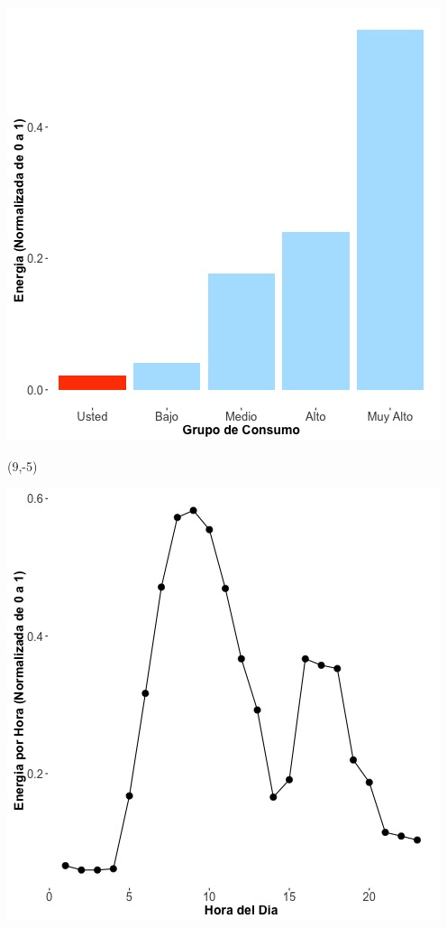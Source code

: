 \documentclass{article}\usepackage[]{graphicx}\usepackage[]{color}
\newenvironment{knitrout}{}{} %
\begin{document}
\begin{knitrout}
\color{fgcolor}
\includegraphics[scale=0.65]{figure/A6_neighbor_plot} 
\end{knitrout}

 \begin{textblock}{1}(9,-5)
\begin{minipage}{20em}
\begingroup

\endgroup
\end{minipage}
\end{textblock}


\begin{knitrout}
\color{fgcolor}
\includegraphics[scale=0.65]{figure/A6_plot_norm_median} 
\end{knitrout}
\end{document}
